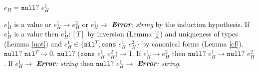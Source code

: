 \begin{case}

$e_{H}=\mathtt{null?}$ $e_{H}^{1}$

$e_{H}^{1}$ is a value or $e_{H}^{1}\rightarrow e_{H}^{2}$ or $e_{H}^{1}\rightarrow$ \emph{\textbf{Error}: string} by the induction hypothesis.  If $e_{H}^{1}$ is a value then $e_{H}^{1}:[T]$ by inversion (Lemma \ref{i}) and uniqueness of types (Lemma \ref{uot}) and $e_{H}^{1}\in\lbrace\mathtt{nil}^{T},\mathtt{cons}$ $e_{H}^{1}$ $e_{H}^{2}\rbrace$ by canonical forms (Lemma \ref{cf}).  $\mathtt{null?}$ $\mathtt{nil}^{T}\rightarrow\overline{0}$.  $\mathtt{null?}$ $(\mathtt{cons}$ $e_{H}^{1}$ $e_{H}^{2})\rightarrow\overline{1}$.  If $e_{H}^{1}\rightarrow e_{H}^{2}$ then $\mathtt{null?}$ $e_{H}^{1}\rightarrow\mathtt{null?}$ $e_{H}^{2}$.  If $e_{H}^{1}\rightarrow$ \emph{\textbf{Error}: string} then $\mathtt{null?}$ $e_{H}^{1}\rightarrow$ \emph{\textbf{Error}: string}.

\end{case}